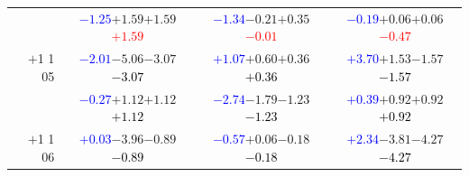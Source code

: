 \documentclass[compress]{beamer}
\begin{document}
\begin{frame}
\begin{tabular}{r | c | c | c}
          & \textcolor{blue}{$-1.25$}\hspace{0.1 cm}$+1.59$\hspace{0.1 cm}$+1.59$\hspace{0.1 cm}\textcolor{red}{$+1.59$} & \textcolor{blue}{$-1.34$}\hspace{0.1 cm}$-0.21$\hspace{0.1 cm}$+0.35$\hspace{0.1 cm}\textcolor{red}{$-0.01$} & \textcolor{blue}{$-0.19$}\hspace{0.1 cm}$+0.06$\hspace{0.1 cm}$+0.06$\hspace{0.1 cm}\textcolor{red}{$-0.47$} \\
$+$1 1 05 & \textcolor{blue}{$-2.01$}\hspace{0.1 cm}$-5.06$\hspace{0.1 cm}$-3.07$\hspace{0.1 cm}\textcolor{black}{$-3.07$} & \textcolor{blue}{$+1.07$}\hspace{0.1 cm}$+0.60$\hspace{0.1 cm}$+0.36$\hspace{0.1 cm}\textcolor{black}{$+0.36$} & \textcolor{blue}{$+3.70$}\hspace{0.1 cm}$+1.53$\hspace{0.1 cm}$-1.57$\hspace{0.1 cm}\textcolor{black}{$-1.57$} \\
          & \textcolor{blue}{$-0.27$}\hspace{0.1 cm}$+1.12$\hspace{0.1 cm}$+1.12$\hspace{0.1 cm}\textcolor{black}{$+1.12$} & \textcolor{blue}{$-2.74$}\hspace{0.1 cm}$-1.79$\hspace{0.1 cm}$-1.23$\hspace{0.1 cm}\textcolor{black}{$-1.23$} & \textcolor{blue}{$+0.39$}\hspace{0.1 cm}$+0.92$\hspace{0.1 cm}$+0.92$\hspace{0.1 cm}\textcolor{black}{$+0.92$} \\
$+$1 1 06 & \textcolor{blue}{$+0.03$}\hspace{0.1 cm}$-3.96$\hspace{0.1 cm}$-0.89$\hspace{0.1 cm}\textcolor{black}{$-0.89$} & \textcolor{blue}{$-0.57$}\hspace{0.1 cm}$+0.06$\hspace{0.1 cm}$-0.18$\hspace{0.1 cm}\textcolor{black}{$-0.18$} & \textcolor{blue}{$+2.34$}\hspace{0.1 cm}$-3.81$\hspace{0.1 cm}$-4.27$\hspace{0.1 cm}\textcolor{black}{$-4.27$} \\

\end{tabular}
\end{frame}
\end{document}

